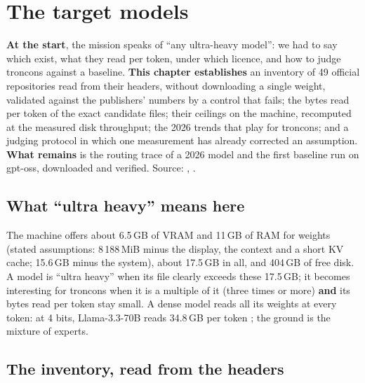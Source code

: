 \chapter{The target models}\label{ch:modeles}

\begin{origine}
\textbf{At the start}, the mission speaks of \enquote{any ultra-heavy model}: we had to say which exist, what they read per token, under which licence, and how to judge troncons against a baseline.
\textbf{This chapter establishes} an inventory of 49 official repositories read from their headers, without downloading a single weight, validated against the publishers' numbers by a control that fails; the bytes read per token of the exact candidate files; their ceilings on the machine, recomputed at the measured disk throughput; the 2026 trends that play for troncons; and a judging protocol in which one measurement has already corrected an assumption.
\textbf{What remains} is the routing trace of a 2026 model and the first baseline run on gpt-oss, downloaded and verified.
Source: , .
\end{origine}

\section{What \enquote{ultra heavy} means here}

The machine offers about 6.5\,GB of VRAM and 11\,GB of RAM for weights (stated assumptions: 8\,188\,MiB minus the display, the context and a short KV cache; 15.6\,GB minus the system), about 17.5\,GB in all, and 404\,GB of free disk. A model is \enquote{ultra heavy} when its file clearly exceeds these 17.5\,GB; it becomes interesting for troncons when it is a multiple of it (three times or more) \textbf{and} its bytes read per token stay small. A dense model reads all its weights at every token: at 4 bits, Llama-3.3-70B reads 34.8\,GB per token \calc; the ground is the mixture of experts.

\section{The inventory, read from the headers}\label{sec:inventaire}

